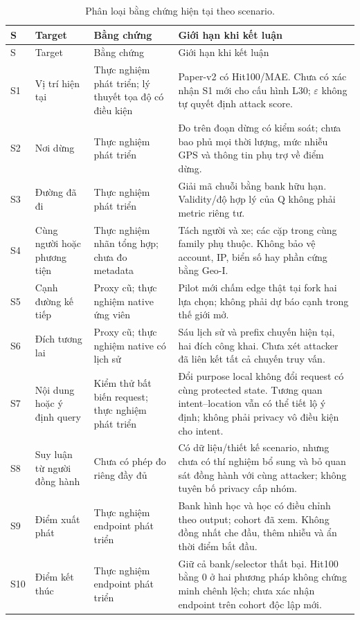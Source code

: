 \begingroup
\small
\setlength{\tabcolsep}{4pt}
\begin{longtable}{P{0.7cm}P{3.4cm}P{3.0cm}P{7.3cm}}
\caption{Phân loại bằng chứng hiện tại theo scenario.}\label{tab:current-scenario-coverage}\\
\toprule S & Target & Bằng chứng & Giới hạn khi kết luận \\\midrule
\endfirsthead
\toprule S & Target & Bằng chứng & Giới hạn khi kết luận \\\midrule
\endhead
S1 & Vị trí hiện tại & Thực nghiệm phát triển; lý thuyết tọa độ có điều kiện &
Paper-v2 có Hit100/MAE. Chưa có xác nhận S1 mới cho cấu hình L30; $\varepsilon$ không tự quyết định attack score. \\
S2 & Nơi dừng & Thực nghiệm phát triển &
Đo trên đoạn dừng có kiểm soát; chưa bao phủ mọi thời lượng, mức nhiễu GPS và thông tin phụ trợ về điểm dừng. \\
S3 & Đường đã đi & Thực nghiệm phát triển &
Giải mã chuỗi bằng bank hữu hạn. Validity/độ hợp lý của Q không phải metric riêng tư. \\
S4 & Cùng người hoặc phương tiện & Thực nghiệm nhãn tổng hợp; chưa đo metadata &
Tách người và xe; các cặp trong cùng family phụ thuộc. Không bảo vệ account, IP, biển số hay phần cứng bằng Geo-I. \\
S5 & Cạnh đường kế tiếp & Proxy cũ; thực nghiệm native ứng viên &
Pilot mới chấm edge thật tại fork hai lựa chọn; không phải dự báo cạnh trong thế giới mở. \\
S6 & Đích tương lai & Proxy cũ; thực nghiệm native có lịch sử &
Sáu lịch sử và prefix chuyến hiện tại, hai đích công khai. Chưa xét attacker đã liên kết tất cả chuyến truy vấn. \\
S7 & Nội dung hoặc ý định query & Kiểm thử bất biến request; thực nghiệm phát triển &
Đổi purpose local không đổi request có cùng protected state. Tương quan intent--location vẫn có thể tiết lộ ý định; không phải privacy vô điều kiện cho intent. \\
S8 & Suy luận từ người đồng hành & Chưa có phép đo riêng đầy đủ &
Có dữ liệu/thiết kế scenario, nhưng chưa có thí nghiệm bổ sung và bỏ quan sát đồng hành với cùng attacker; không tuyên bố privacy cấp nhóm. \\
S9 & Điểm xuất phát & Thực nghiệm endpoint phát triển &
Bank hình học và học có điều chỉnh theo output; cohort đã xem. Không đồng nhất che đầu, thêm nhiễu và ẩn thời điểm bắt đầu. \\
S10 & Điểm kết thúc & Thực nghiệm endpoint phát triển &
Giữ cả bank/selector thất bại. Hit100 bằng 0 ở hai phương pháp không chứng minh chênh lệch; chưa xác nhận endpoint trên cohort độc lập mới. \\
\bottomrule
\end{longtable}
\endgroup

